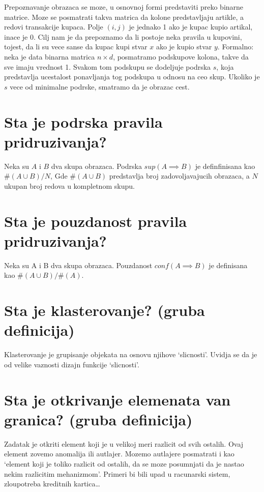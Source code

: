 \documentclass[a4paper]{article}
\begin{document}
Prepoznavanje obrazaca se moze, u osnovnoj formi predstaviti preko binarne matrice. Moze se
posmatrati takva matrica da kolone predstavljaju artikle, a redovi transakcije kupaca. Polje
\((i,j)\) je jednako 1 ako je kupac kupio artikal, inace je 0. Cilj nam je da prepoznamo da li postoje
neka pravila u kupovini, tojest, da li su vece sanse da kupac kupi stvar \(x\) ako je kupio stvar
\(y\). Formalno: neka je data binarna matrica \(n \times d\), posmatramo podskupove kolona, takve
da sve imaju vrednost 1. Svakom tom podskupu se dodeljuje podrska \(s\), koja predstavlja
ucestalost ponavljanja tog podskupa u odnosu na ceo skup. Ukoliko je \(s\) vece od minimalne
podrske, smatramo da je obrazac cest.

\section{Sta je podrska pravila pridruzivanja?}

Neka su \(A\) i \(B\) dva skupa obrazaca. Podrska \(sup(A \implies B)\) je
definfinisana kao \(\#(A \cup B) / N\), Gde \(\#(A \cup B)\) predstavlja broj
zadovoljavajucih obrazaca, a \(N\) ukupan broj redova u kompletnom skupu.

\section{Sta je pouzdanost pravila pridruzivanja?}

Neka su A i B dva skupa obrazaca. Pouzdanost \(conf(A \implies B)\) je definisana kao
\(\#(A \cup B) / \#(A)\).

\section{Sta je klasterovanje? (gruba definicija)}

Klasterovanje je grupisanje objekata na osnovu njihove `slicnosti'. Uvidja se da je od velike
vaznosti dizajn funkcije `slicnosti'.

\section{Sta je otkrivanje elemenata van granica? (gruba definicija)}

Zadatak je otkriti element koji je u velikoj meri razlicit od svih ostalih. Ovaj element zovemo
anomalija ili autlajer. Mozemo autlajere posmatrati i kao `element koji je toliko razlicit od
ostalih, da se moze posumnjati da je nastao nekim razlicitim mehanizmom'. Primeri bi bili upad u
racunarski sistem, zloupotreba kreditnih kartica\ldots
\end{document}
